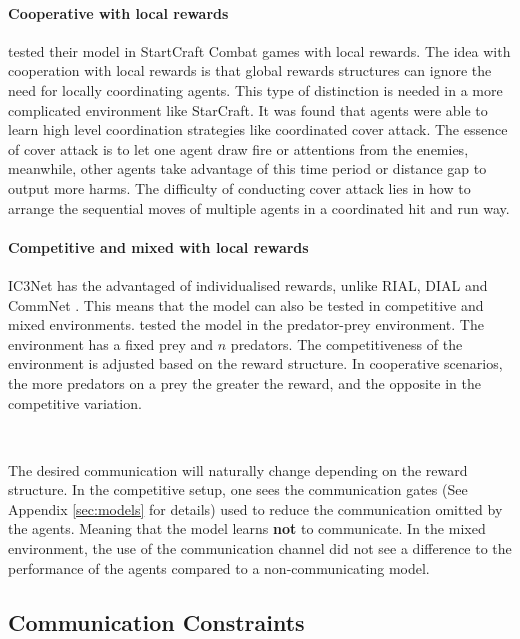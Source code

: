 \documentclass{article}
\begin{document}
\paragraph{Cooperative with local rewards}

\citet{peng2017bicnet} tested their model in StartCraft Combat games with local rewards. The idea with cooperation with local rewards is that global rewards structures can ignore the need for locally coordinating agents. This type of distinction is needed in a more complicated environment like StarCraft. It was found that agents were able to learn high level coordination strategies  like coordinated cover attack. The essence of cover attack is to let one agent draw fire or  attentions from the enemies, meanwhile, other agents take  advantage of this time period or distance gap to output more  harms. The difficulty of conducting cover attack lies in how  to arrange the sequential moves of multiple agents in a coordinated hit and run way. 

\paragraph{Competitive and mixed with local rewards}

IC3Net \citep{singh2018ic3net} has the advantaged of individualised rewards, unlike RIAL, DIAL \citep{foerster2016learning} and CommNet \citep{sukhbaatar2016commnet}. This means that the model can also be tested in competitive and mixed environments. \citet{singh2018ic3net} tested the model in the predator-prey environment. The environment has a fixed prey and $n$ predators. The competitiveness of the environment is adjusted based on the reward structure. In cooperative scenarios, the more predators on a prey the greater the reward, and the opposite in the competitive variation.

\

The desired communication will naturally change depending on the reward structure. In the competitive setup, one sees the communication gates (See Appendix \ref{sec:models} for details) used to reduce the communication omitted by the agents. Meaning that the model learns \textbf{not} to communicate. In the mixed environment, the use of the communication channel did not see a difference to the performance of the agents compared to a non-communicating model.  

\subsection{Communication Constraints}
\end{document}
